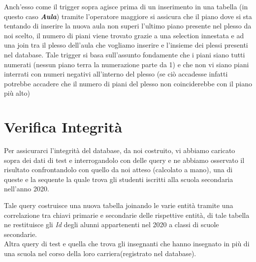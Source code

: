 \documentclass{article}
\begin{document}
\vspace{0.5 cm}
 


\vspace{0.5 cm}

Anch’esso come il trigger sopra agisce prima di un inserimento in una tabella (in questo caso \textit{\textbf{Aula}}) tramite l’operatore maggiore si assicura che il piano dove si sta tentando di inserire la nuova aula non superi l’ultimo piano presente nel plesso da noi scelto, il numero di piani viene trovato  grazie a una selection innestata e ad una join tra il plesso dell’aula che vogliamo inserire e l’insieme dei  plessi presenti nel database. Tale trigger si basa sull'assunto fondamente che i piani siano tutti numerati (nessun piano terra la numerazione parte da 1) e che non vi siano piani interrati con numeri negativi all'interno del plesso (se ciò accadesse infatti potrebbe accadere che il numero di piani del plesso non coinciderebbe con il piano più alto)

\section{Verifica Integrità}
Per assicurarci l’integrità del database, da noi costruito, vi abbiamo caricato sopra dei dati di test e interrogandolo con delle query e ne abbiamo osservato il risultato confrontandolo con quello da noi atteso (calcolato a mano), una di queste e la sequente la quale trova gli studenti iscritti alla scuola secondaria nell’anno 2020.

\vspace{0.5 cm}



\vspace{0.5 cm}

Tale query costruisce una nuova tabella joinando le varie entità tramite una correlazione tra chiavi primarie e secondarie delle rispettive entità, di tale tabella ne restituisce gli \textit{Id} degli alunni appartenenti nel 2020 a classi di scuole secondarie.\\
Altra query di test e quella che trova  gli insegnanti che hanno insegnato in più di una scuola nel corso della loro carriera(registrato nel database).


\vspace{0.5 cm}


\end{document}
